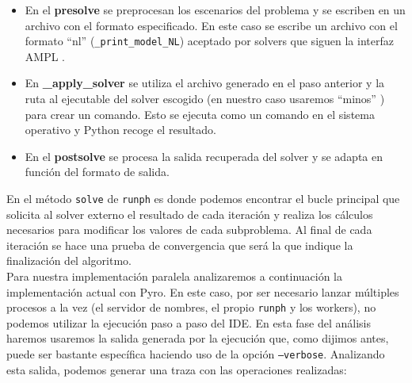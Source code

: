 \begin{itemize}
    \item En el \textbf{presolve} se preprocesan los escenarios del problema y se escriben en un archivo con el formato especificado. En este caso se escribe un archivo con el formato ``nl'' (\texttt{\_print\_model\_NL}) aceptado por solvers que siguen la interfaz AMPL \cite{AMPL}.
    \item En \textbf{\_apply\_solver} se utiliza el archivo generado en el paso anterior y la ruta al ejecutable del solver escogido (en nuestro caso usaremos ``minos'' \cite{minos}) para crear un comando. Esto se ejecuta como un comando en el sistema operativo y Python recoge el resultado.
    \item En el \textbf{postsolve} se procesa la salida recuperada del solver y se adapta en función del formato de salida.
\end{itemize}

En el método \texttt{solve} de \texttt{runph} es donde podemos encontrar el bucle principal que solicita al solver externo el resultado de cada iteración y realiza los cálculos necesarios para modificar los valores de cada subproblema. Al final de cada iteración se hace una prueba de convergencia que será la que indique la finalización del algoritmo.\\

Para nuestra implementación paralela analizaremos a continuación la implementación actual con Pyro. En este caso, por ser necesario lanzar múltiples procesos a la vez (el servidor de nombres, el propio \texttt{runph} y los workers), no podemos utilizar la ejecución paso a paso del IDE. En esta fase del análisis haremos usaremos la salida generada por la ejecución que, como dijimos antes, puede ser bastante específica haciendo uso de la opción \texttt{--verbose}. Analizando esta salida, podemos generar una traza con las operaciones realizadas:\\

